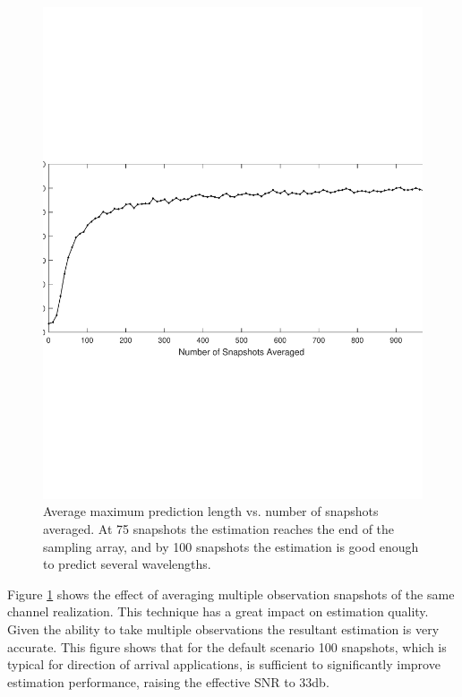 \documentclass{allertonproc}
\begin{document}
\begin{figure}[tbp]
\begin{center}
\includegraphics[width=6in]{numSnapshots}
\caption{Average maximum prediction length vs. number of snapshots averaged. At 75 snapshots the estimation reaches the end of the sampling array, and by 100 snapshots the estimation is good enough to predict several wavelengths.}\label{snapshot}
\end{center}
\end{figure}
Figure \ref{snapshot} shows the effect of averaging multiple observation snapshots of the same channel realization.  This technique has a great impact on estimation quality. Given the ability to take multiple observations the resultant estimation is very accurate. This figure shows that for the default scenario 100 snapshots, which is typical for direction of arrival applications, is sufficient to significantly improve estimation performance, raising the effective SNR to $33$db. 
\end{document}
